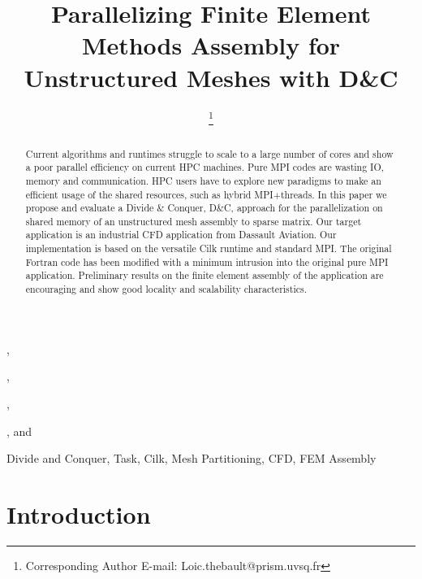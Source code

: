 \documentclass{IOS-Book-Article}
\begin{document}
\begin{frontmatter}              %

\title{Parallelizing Finite Element Methods Assembly for Unstructured Meshes with D\&C}

\author[A]{ %
\thanks{Corresponding Author E-mail: Loic.thebault@prism.uvsq.fr}},
\author[A]{ },
\author[A]{ },
\author[B]{ },
and
\author[A]{ }

\address[A]{PRISM - University of Versailles, France}
\address[B]{Dassault Aviation, Saint-Cloud, France}

\begin{abstract}
Current algorithms and runtimes struggle to scale to a large number of cores and show a poor parallel efficiency on current HPC machines.
Pure MPI codes are wasting IO, memory and communication. HPC users have to explore new paradigms to make an efficient usage of the shared resources,
such as hybrid MPI+threads.
In this paper we propose and evaluate a Divide \& Conquer, D\&C, approach for the parallelization on shared memory of an unstructured mesh assembly to sparse matrix.
Our target application is an industrial CFD application from Dassault Aviation.
Our implementation is based on the versatile Cilk runtime and standard MPI.
The original Fortran code has been modified with a minimum intrusion into the original pure MPI application.
Preliminary results on the finite element assembly of the application are encouraging and show good locality and scalability characteristics.
\end{abstract}

\begin{keyword}
Divide and Conquer, Task, Cilk, Mesh Partitioning, CFD, FEM Assembly
\end{keyword}
\end{frontmatter}

\thispagestyle{empty}
\pagestyle{empty}

\section{Introduction}
\end{document}
